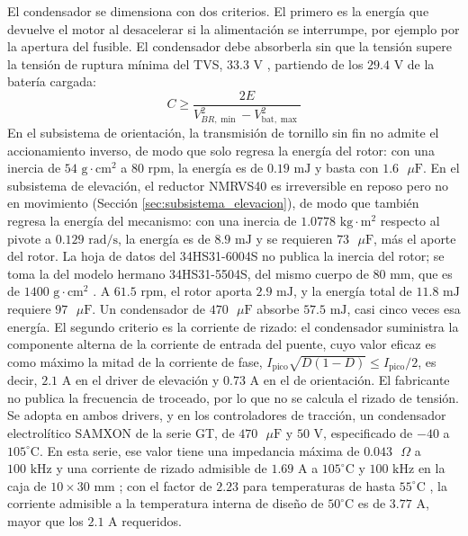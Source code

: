 \documentclass[../../General.tex]{subfiles}
\begin{document}
El condensador se dimensiona con dos criterios. El primero es la energía que devuelve el motor al desacelerar si la alimentación se interrumpe, por ejemplo por la apertura del fusible. El condensador debe absorberla sin que la tensión supere la tensión de ruptura mínima del TVS, $33.3\text{ V}$ \citep{vishay_smbj}, partiendo de los $29.4\text{ V}$ de la batería cargada:
\begin{equation}
C \geq \frac{2E}{V_{BR,\min}^2 - V_{\text{bat},\max}^2}
\end{equation}
En el subsistema de orientación, la transmisión de tornillo sin fin no admite el accionamiento inverso, de modo que solo regresa la energía del rotor: con una inercia de $54\text{ g}\cdot\text{cm}^2$ \citep{stepperonline_17hs16} a $80\text{ rpm}$, la energía es de $0.19\text{ mJ}$ y basta con $1.6\text{ }\mu\text{F}$. En el subsistema de elevación, el reductor NMRVS40 es irreversible en reposo pero no en movimiento (Sección \ref{sec:subsistema_elevacion}), de modo que también regresa la energía del mecanismo: con una inercia de $1.0778\text{ kg}\cdot\text{m}^2$ respecto al pivote a $0.129\text{ rad/s}$, la energía es de $8.9\text{ mJ}$ y se requieren $73\text{ }\mu\text{F}$, más el aporte del rotor. La hoja de datos del 34HS31-6004S no publica la inercia del rotor; se toma la del modelo hermano 34HS31-5504S, del mismo cuerpo de $80\text{ mm}$, que es de $1400\text{ g}\cdot\text{cm}^2$ \citep{oyostepper_34hs31_5504s}. A $61.5\text{ rpm}$, el rotor aporta $2.9\text{ mJ}$, y la energía total de $11.8\text{ mJ}$ requiere $97\text{ }\mu\text{F}$. Un condensador de $470\text{ }\mu\text{F}$ absorbe $57.5\text{ mJ}$, casi cinco veces esa energía. El segundo criterio es la corriente de rizado: el condensador suministra la componente alterna de la corriente de entrada del puente, cuyo valor eficaz es como máximo la mitad de la corriente de fase, $I_{\text{pico}} \sqrt{D(1-D)} \leq I_{\text{pico}}/2$, es decir, $2.1\text{ A}$ en el driver de elevación y $0.73\text{ A}$ en el de orientación. El fabricante no publica la frecuencia de troceado, por lo que no se calcula el rizado de tensión. Se adopta en ambos drivers, y en los controladores de tracción, un condensador electrolítico SAMXON de la serie GT, de $470\text{ }\mu\text{F}$ y $50\text{ V}$, especificado de $-40$ a $105^\circ\text{C}$. En esta serie, ese valor tiene una impedancia máxima de $0.043\text{ }\Omega$ a $100\text{ kHz}$ y una corriente de rizado admisible de $1.69\text{ A}$ a $105^\circ\text{C}$ y $100\text{ kHz}$ en la caja de $10 \times 30\text{ mm}$ \citep{samxon_gt}; con el factor de $2.23$ para temperaturas de hasta $55^\circ\text{C}$ \citep{samxon_gt}, la corriente admisible a la temperatura interna de diseño de $50^\circ\text{C}$ es de $3.77\text{ A}$, mayor que los $2.1\text{ A}$ requeridos.
\end{document}
